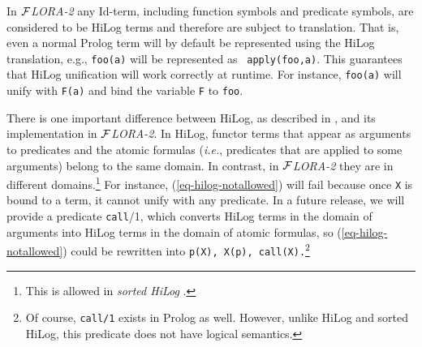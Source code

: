 \documentclass[11pt]{article}
\newcommand{\FLORA}{{\mbox{${\cal F}${\small\it LORA}\rm\emph{-2}}}\xspace}
\begin{document}
In \FLORA any Id-term, including function symbols and predicate symbols,
are considered to be HiLog terms and therefore are subject to translation.
That is, even a normal Prolog term will by default be represented using the
HiLog translation, e.g., {\tt foo(a)} will be represented as {\tt
  apply(foo,a)}. This guarantees that HiLog unification will work correctly
at runtime. For instance, {\tt foo(a)} will unify with {\tt F(a)} and bind
the variable {\tt F} to {\tt foo}.

There is one important difference between HiLog, as described in
\cite{hilog-jlp}, and its implementation in \FLORA. In HiLog, functor terms
that appear as arguments to predicates and the atomic formulas ({\it i.e.},
predicates that are applied to some arguments) belong to the same domain. 
In contrast, in \FLORA they are in different domains.\footnote{
  This is allowed in \emph{sorted HiLog} \cite{hilog-icdt-95}. 
  }
For instance, (\ref{eq-hilog-notallowed}) will fail because once {\tt X} is
bound to a term, it cannot unify with any predicate. In a future release,
we will provide a predicate {\tt call}/1, which converts HiLog terms in the
domain of arguments into HiLog terms in the domain of atomic formulas, so
(\ref{eq-hilog-notallowed}) could be rewritten into {\tt p(X), X(p), call(X).}\footnote{
  Of course, {\tt call/1} exists in Prolog as well. However, unlike HiLog
  and sorted HiLog, this predicate does not have logical semantics.
  }
\end{document}
